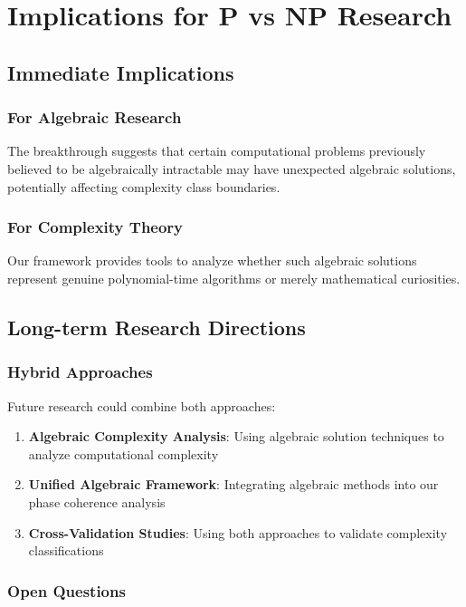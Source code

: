 \documentclass[12pt]{article}
\begin{document}
\section{Implications for P vs NP Research}

\subsection{Immediate Implications}

\subsubsection{For Algebraic Research}
The breakthrough suggests that certain computational problems previously believed to be algebraically intractable may have unexpected algebraic solutions, potentially affecting complexity class boundaries.

\subsubsection{For Complexity Theory}
Our framework provides tools to analyze whether such algebraic solutions represent genuine polynomial-time algorithms or merely mathematical curiosities.

\subsection{Long-term Research Directions}

\subsubsection{Hybrid Approaches}
Future research could combine both approaches:

\begin{enumerate}
    \item \textbf{Algebraic Complexity Analysis}: Using algebraic solution techniques to analyze computational complexity
    \item \textbf{Unified Algebraic Framework}: Integrating algebraic methods into our phase coherence analysis
    \item \textbf{Cross-Validation Studies}: Using both approaches to validate complexity classifications
\end{enumerate}

\subsubsection{Open Questions}
\end{document}
